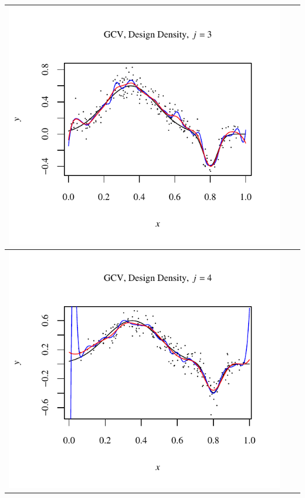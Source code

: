 \documentclass[11pt]{article}
\begin{document}
\begin{table}[h!]
\begin{center}
\begin{tabular}{| >{\centering\arraybackslash}m{2.1in} |  >{\centering\arraybackslash}m{2.1in} |  >{\centering\arraybackslash}m{2.1in}|}
      \includegraphics[width=1\linewidth,height=0.18\textheight]{Graphs/2/2/assignment5_a_2_2_3}\\\hline
      \includegraphics[width=1\linewidth,height=0.18\textheight]{Graphs/2/2/assignment5_a_2_2_4}&

\end{tabular}
\end{center}
\end{table}
\end{document}
